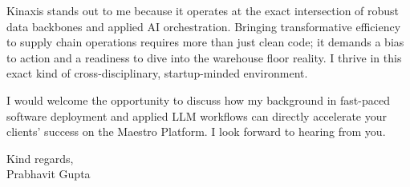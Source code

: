 \documentclass[11pt,a4paper]{article}
\begin{document}
Kinaxis stands out to me because it operates at the exact intersection of robust data backbones and applied AI orchestration. Bringing transformative efficiency to supply chain operations requires more than just clean code; it demands a bias to action and a readiness to dive into the warehouse floor reality. I thrive in this exact kind of cross-disciplinary, startup-minded environment.


I would welcome the opportunity to discuss how my background in fast-paced software deployment and applied LLM workflows can directly accelerate your clients' success on the Maestro Platform. I look forward to hearing from you.


\begin{flushright}
Kind regards, \\[3ex]


Prabhavit Gupta

\end{flushright}
\end{document}
